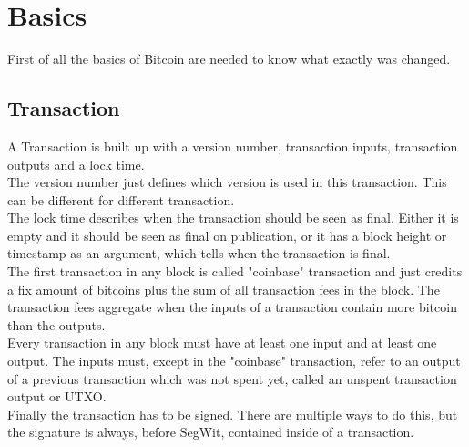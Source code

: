 
\section{Basics}
\label{ch:Basics}

First of all the basics of Bitcoin are needed to know what exactly was changed. 

\subsection{Transaction}
\label{sec:Introduction:Basics:Transaction}

A Transaction is built up with a version number, transaction inputs, transaction outputs and a lock time. \\
The version number just defines which version is used in this transaction. This can be different for different transaction. \\
The lock time describes when the transaction should be seen as final. Either it is empty and it should be seen as final on publication, or it has a block height or timestamp as an argument, which tells when the transaction is final. \\
The first transaction in any block is called "coinbase" transaction and just credits a fix amount of bitcoins plus the sum of all transaction fees in the block. The transaction fees aggregate when the inputs of a transaction contain more bitcoin than the outputs. \\
Every transaction in any block must have at least one input and at least one output. The inputs must, except in the "coinbase" transaction, refer to an output of a previous transaction which was not spent yet, called an unspent transaction output or UTXO. \\
Finally the transaction has to be signed. There are multiple ways to do this, but the signature is always, before SegWit, contained inside of a transaction.


